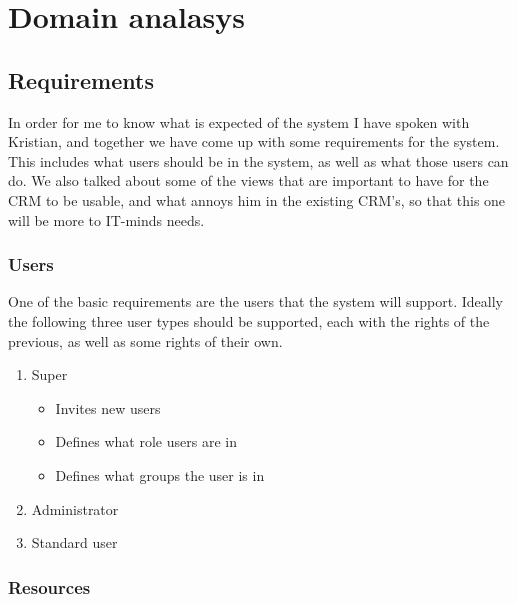 \chapter{Domain analasys}
\label{chap:Domain analasys}

\section{Requirements}
\label{sec:Requirements}
In order for me to know what is expected of the system I have spoken with Kristian, and together we have come up with some requirements for the system. This includes what users should be in the system, as well as what those users can do. We also talked about some of the views that are important to have for the CRM to be usable, and what annoys him in the existing CRM's, so that this one will be more to IT-minds needs.

\subsection{Users}
\label{sub:Users}

One of the basic requirements are the users that the system will support. Ideally the following three user types should be supported, each with the rights of the previous, as well as some rights of their own.

\begin{enumerate}
  \item Super
  \begin{itemize}
    \item Invites new users
    \item Defines what role users are in
    \item Defines what groups the user is in
  \end{itemize}
  \item Administrator
  \item Standard user
\end{enumerate}


\subsection{Resources}
\label{sub:Resources}

